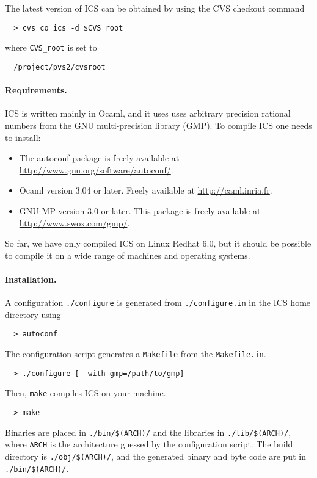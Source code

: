\documentclass[12pt]{article}
\begin{document}
The latest version of ICS can be obtained by using the
CVS checkout command
  \begin{verbatim}
  > cvs co ics -d $CVS_root
  \end{verbatim} %
where \texttt{CVS\_root} is set to
  \begin{verbatim}
  /project/pvs2/cvsroot
  \end{verbatim}

\paragraph{Requirements.}
ICS is written mainly in Ocaml, and it uses uses arbitrary
precision rational numbers from the GNU multi-precision library (GMP)\@.
To compile ICS one needs to install:
  \begin{itemize}
  \item The \textsf{autoconf} package is freely available
        at \url{http://www.gnu.org/software/autoconf/}\@.
  \item \textsf{Ocaml} version 3.04 or later.
        Freely available at \url{http://caml.inria.fr}\@.
  \item \textsf{GNU MP} version 3.0 or later. This package is
        freely available at \url{http://www.swox.com/gmp/}\@.
  \end{itemize}
So far, we have only compiled \textsf{ICS} on \textsf{Linux Redhat 6.0},
but it should be possible to compile it on a wide range of
machines and operating systems.

\paragraph{Installation.}
A configuration \texttt{./configure} is generated from
\texttt{./configure.in} in the ICS home directory using
  \begin{verbatim}
  > autoconf
  \end{verbatim}
The configuration script generates a \texttt{Makefile} from the
\texttt{Makefile.in}. 
  \begin{verbatim}
  > ./configure [--with-gmp=/path/to/gmp]
  \end{verbatim}
Then, {\tt make} compiles ICS on your machine.
  \begin{verbatim}
  > make
  \end{verbatim}
Binaries are placed in \texttt{./bin/\$(ARCH)/} and
the libraries in {\tt ./lib/\$(ARCH)/}, where \texttt{ARCH}
is the architecture guessed by the configuration script.
The build directory is {\tt ./obj/\$(ARCH)/}, and the generated
binary and byte code are put in \texttt{./bin/\$(ARCH)/}.
\end{document}
